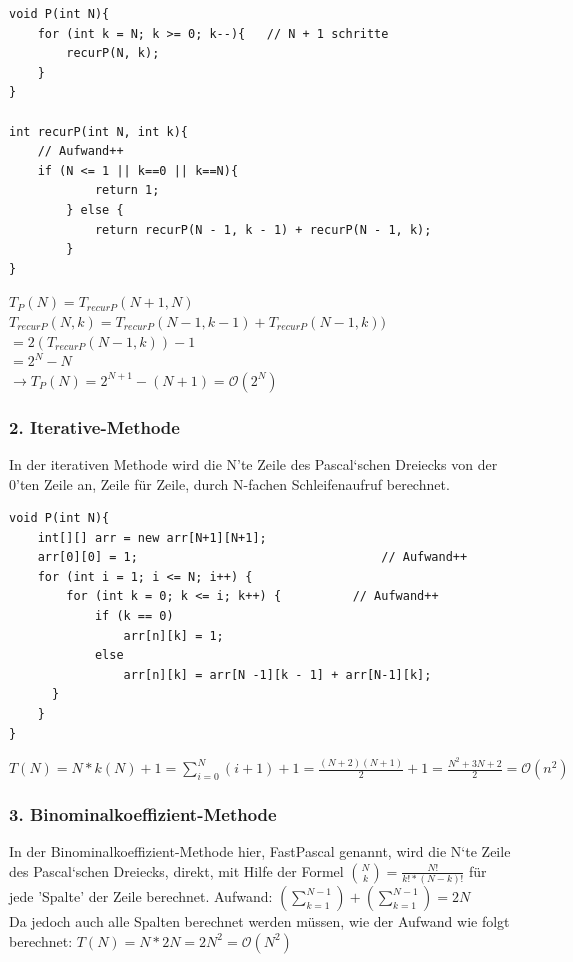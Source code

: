 \documentclass[
   draft=false
  ,paper=a4
  ,twoside=false
  ,fontsize=11pt
  ,headsepline
  ,DIV11
  ,parskip=full+
]{scrartcl} %
\begin{document}
\begin{lstlisting}
void P(int N){
	for (int k = N; k >= 0; k--){   // N + 1 schritte
		recurP(N, k);
	}
}

int recurP(int N, int k){
	// Aufwand++
	if (N <= 1 || k==0 || k==N){
			return 1;                             
		} else {
			return recurP(N - 1, k - 1) + recurP(N - 1, k); 
		}
}
\end{lstlisting}
$ T_P(N) = T_{recurP}(N+1,N)$  \\
$ T_{recurP}(N,k) = T_{recurP}(N-1,k-1)+T_{recurP}(N-1,k)) $  \\
$ = 2(T_{recurP}(N-1,k)) - 1 \quad$ \\
$ = 2^N - N  \, \: \: \qquad \qquad$ \\
$ \rightarrow T_P(N) = 2^{N+1} - (N+1)  = \mathcal{O}(2^N) $

\newpage

\subsubsection*{2. Iterative-Methode}
In der iterativen Methode wird die N'te Zeile des Pascal`schen Dreiecks von der 0'ten Zeile an, Zeile für Zeile, durch N-fachen Schleifenaufruf berechnet.

\begin{lstlisting}
void P(int N){
	int[][] arr = new arr[N+1][N+1];
	arr[0][0] = 1;                                  // Aufwand++
	for (int i = 1; i <= N; i++) {
		for (int k = 0; k <= i; k++) {          // Aufwand++
			if (k == 0)
				arr[n][k] = 1;                     
			else
				arr[n][k] = arr[N -1][k - 1] + arr[N-1][k];
      }
    }
}
\end{lstlisting}
\begin{math}
T(N)= N*k(N) +1 = \sum^N_{i=0}(i+1) + 1 = \frac{(N+2)(N+1)}{2} +1 = \frac{N^2+3N+2}{2} = \mathcal{O}(n^2)
\end{math}
\subsubsection*{3. Binominalkoeffizient-Methode}
In der Binominalkoeffizient-Methode hier, FastPascal genannt, wird die N`te Zeile des Pascal`schen Dreiecks, direkt, mit Hilfe der Formel 
$\binom{N}{k} = \frac{N!}{k!*(N-k)!}$ 
für jede 'Spalte' der Zeile berechnet.
Aufwand: $(\sum\nolimits_{k=1}^{N-1})+(\sum\nolimits_{k=1}^{N-1}) = 2N$ \\
Da jedoch auch alle Spalten berechnet werden müssen, wie der Aufwand wie folgt berechnet:
$T(N)= N* 2N = 2N^2 = \mathcal{O}(N^2)$
\end{document}
